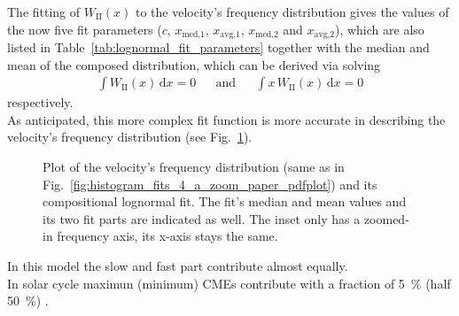 The fitting of $W_\text{II}(x)$ to the velocity's frequency distribution gives the values of the now five fit parameters ($c$, $x_\text{med,1}$, $x_\text{avg,1}$, $x_\text{med,2}$ and $x_\text{avg,2}$), which are also listed in Table~\ref{tab:lognormal_fit_parameters} together with the median and mean of the composed distribution, which can be derived via solving
\begin{align}
	\int W_\text{II}(x)\,\text{d}x = 0	&	&\text{and}	&	&\int x\,W_\text{II}(x)\,\text{d}x = 0
\end{align}
respectively.\\
As anticipated, this more complex fit function is more accurate in describing the velocity's frequency distribution (see Fig.~\ref{fig:histogram_fits_V_a_zoom_dbl_paper_pdfplot}).\\
\begin{figure}
	\caption{Plot of the velocity's frequency distribution (same as in Fig.~\ref{fig:histogram_fits_4_a_zoom_paper_pdfplot}) and its compositional lognormal fit. The fit's median and mean values and its two fit parts are indicated as well. The inset only has a zoomed-in frequency axis, its x-axis stays the same.}
	\label{fig:histogram_fits_V_a_zoom_dbl_paper_pdfplot}
\end{figure}
In this model the slow and fast part contribute almost equally.\\

In solar cycle maximun (minimum) CMEs contribute with a fraction of \SI{5}{\percent} (half \SI{50}{\percent}) \citep{Richardson2012}.\\

